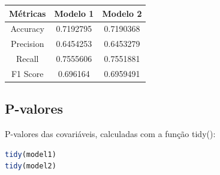 \documentclass[article,11pt,a4paper,brazil]{abntex2}
\begin{document}
	\begin{center}
		\begin{tabular}{|c|c|c|}
		\hline
		\textbf{Métricas} & \textbf{Modelo 1} & \textbf{Modelo 2} \\
		\hline
		Accuracy & 0.7192795 & 0.7190368 \\
		Precision & 0.6454253 & 0.6453279 \\
		Recall & 0.7555606 & 0.7551881 \\
		F1 Score & 0.696164 & 0.6959491 \\
		\hline
	\end{tabular}
	\end{center}
	
	\subsection{P-valores}
	\noindent P-valores das covariáveis, calculadas com a função tidy():
	\begin{lstlisting}[language=R]
tidy(model1)
tidy(model2)
	\end{lstlisting}
\end{document}
